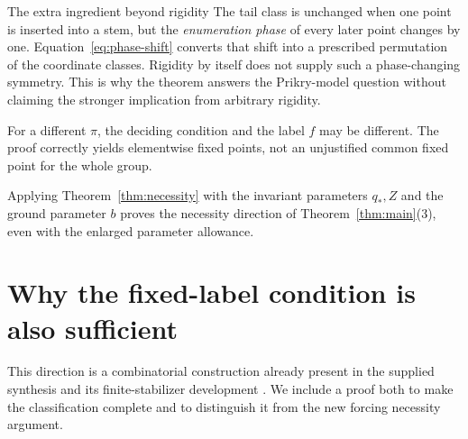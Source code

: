 \documentclass[11pt,letterpaper]{article}
\theoremstyle{definition}
\numberwithin{equation}{section}
\begin{document}
\begin{assessment}{The extra ingredient beyond rigidity}
The tail class is unchanged when one point is inserted into a stem, but the \emph{enumeration phase} of every later point changes by one. Equation~\eqref{eq:phase-shift} converts that shift into a prescribed permutation of the coordinate classes. Rigidity by itself does not supply such a phase-changing symmetry. This is why the theorem answers the Prikry-model question without claiming the stronger implication from arbitrary rigidity.
\end{assessment}

For a different $\pi$, the deciding condition and the label $f$ may be different. The proof correctly yields elementwise fixed points, not an unjustified common fixed point for the whole group.

Applying Theorem~\ref{thm:necessity} with the invariant parameters $q_*,Z$ and the ground parameter $b$ proves the necessity direction of Theorem~\ref{thm:main}(3), even with the enlarged parameter allowance.

\section{Why the fixed-label condition is also sufficient}\label{sec:sufficiency}

This direction is a combinatorial construction already present in the supplied synthesis and its finite-stabilizer development \cite{synthesis,lean}. We include a proof both to make the classification complete and to distinguish it from the new forcing necessity argument.
\end{document}
